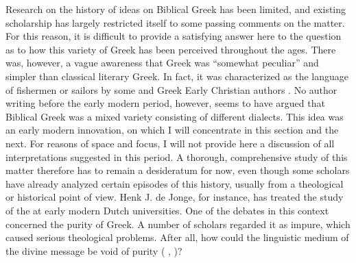 Research on the history of ideas on Biblical Greek has been limited, and existing scholarship has largely restricted itself to some passing comments on the matter. For this reason, it is difficult to provide a satisfying answer here to the question as to how this variety of Greek has been perceived throughout the ages. There was, however, a vague awareness that  Greek was “somewhat peculiar” and simpler than classical literary Greek. In fact, it was characterized as the language of fishermen or sailors by some  and Greek Early Christian authors \citep[647]{Janse2007}. No author writing before the early modern period, however, seems to have argued that Biblical Greek was a mixed variety consisting of different dialects. This idea was an early modern innovation, on which I will concentrate in this section and the next. For reasons of space and focus, I will not provide here a discussion of all interpretations suggested in this period. A thorough, comprehensive study of this matter therefore has to remain a desideratum for now, even though some scholars have already analyzed certain episodes of this history, usually from a theological or historical point of view. Henk J. de Jonge, for instance, has treated the study of the  at early modern Dutch universities. One of the debates in this context concerned the purity of  Greek. A number of scholars regarded it as impure, which caused serious theological problems. After all, how could the linguistic medium of the divine message be void of purity (\citeauthor{De1980} \citeyear[35--38]{De1980}, \citeyear[117--118]{De1981})?

